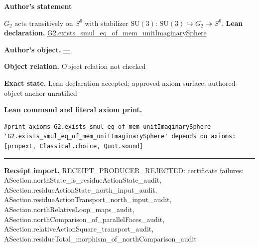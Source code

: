 \documentclass[11pt]{article}
\providecommand{\Gtwo}{G_2}
\theoremstyle{plain}
\theoremstyle{definition}
\theoremstyle{remark}
\begin{document}
\begin{tcolorbox}[provenancecard,title={33. Theorem - \textbackslash{}protect\{\textbackslash{}cite\{Baez02\}\}},title after break={33. Theorem - \textbackslash{}protect\{\textbackslash{}cite\{Baez02\}\} (continued)}]
\textbf{Author's statement}\par
$\Gtwo$ acts transitively on $S^6$ with stabilizer $\mathrm{SU}(3)$:
$\mathrm{SU}(3)\hookrightarrow\Gtwo\twoheadrightarrow S^6$.
\tcblower
\textbf{Lean declaration.} \url{G2.exists_smul_eq_of_mem_unitImaginarySphere}
\par\textbf{Author's object.} \url{—}
\par\textbf{Object relation.} Object relation not checked
\par\textbf{Exact state.} Lean declaration accepted; approved axiom surface; authored-object anchor unratified
\par\smallskip\textbf{Lean command and literal axiom print.}
\begin{Verbatim}[breaklines=true,breakanywhere=true,fontsize=\small]
#print axioms G2.exists_smul_eq_of_mem_unitImaginarySphere
'G2.exists_smul_eq_of_mem_unitImaginarySphere' depends on axioms: [propext, Classical.choice, Quot.sound]
\end{Verbatim}
\medskip\hrule\medskip
\textbf{Receipt import.} \textcolor{KgtRed}{RECEIPT\_PRODUCER\_REJECTED: certificate failures: ASection.northState\_is\_residueActionState\_audit, ASection.residueActionState\_north\_input\_audit, ASection.residueActionTransport\_north\_input\_audit, ASection.northRelativeLoop\_maps\_audit, ASection.northComparison\_of\_parallelFaces\_audit, ASection.relativeActionSquare\_transport\_audit, ASection.residueTotal\_morphism\_of\_northComparison\_audit}
\end{tcolorbox}
\medskip
\end{document}
